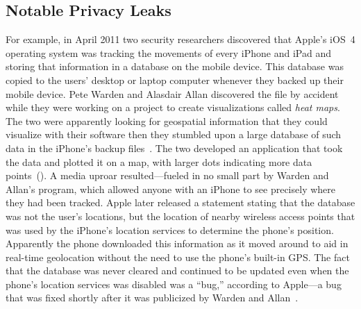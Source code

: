 \subsection{Notable Privacy Leaks}

For example, in April 2011 two security researchers discovered that
Apple's iOS~4 operating system was tracking the movements of every
iPhone and iPad and storing that information in a database on the
mobile device. This database was copied to the users'
desktop or laptop computer whenever they backed up their mobile
device. Pete Warden and Alasdair Allan discovered
the file by accident while they were working on a project to create
visualizations called \emph{heat maps}. The two were apparently
looking for geospatial information that they could visualize with
their software then they stumbled upon a large database of such data
in the iPhone's backup
files~\cite{apple-tracking}. The two developed an application that
took the data and plotted it on a map, with larger dots indicating
more data points~(). A media uproar resulted---fueled
in no small part by Warden and Allan's program, which allowed anyone
with an iPhone to see precisely where they had been tracked. 
Apple later released a
statement stating that the database was
not the user's locations, but the location of nearby wireless access
points that was used by the iPhone's location services to determine
the phone's position. Apparently the phone downloaded this information
as it moved around to aid in real-time geolocation without the need to
use the phone's built-in GPS. The fact that the database was never cleared and
continued to be updated even when the phone's location services was
disabled was a ``bug,'' according to Apple---a bug that was fixed
shortly after it was publicized by Warden and Allan~\cite{apple-tracking-statement}. 

